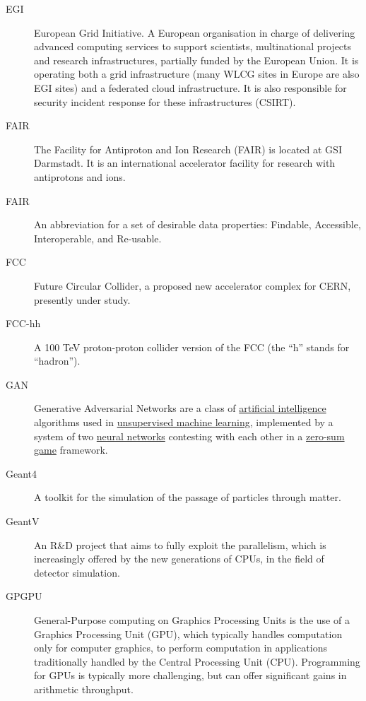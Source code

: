 \documentclass[12pt,a4paper]{article}
\begin{document}
\begin{appendices}
\begin{description}
\item[EGI] European Grid Initiative. A European organisation in charge of
delivering advanced computing services to support scientists,
multinational projects and research infrastructures, partially funded by
the European Union. It is operating both a grid infrastructure (many
WLCG sites in Europe are also EGI sites) and a federated cloud
infrastructure. It is also responsible for security incident response
for these infrastructures (CSIRT).

\item[FAIR] The Facility for Antiproton and Ion Research (FAIR) is located at
GSI Darmstadt. It is an international accelerator facility for research
with antiprotons and ions.

\item[FAIR] An abbreviation for a set of desirable data properties: Findable,
Accessible, Interoperable, and Re-usable.

\item[FCC] Future Circular Collider, a proposed new accelerator complex for
CERN, presently under study.

\item[FCC-hh] A 100 TeV proton-proton collider version of the FCC (the ``h''
stands for ``hadron'').

\item[GAN] Generative Adversarial Networks are a class of
\href{https://en.wikipedia.org/wiki/Artificial_intelligence}{artificial
intelligence} algorithms used in
\href{https://en.wikipedia.org/wiki/Unsupervised_machine_learning}{unsupervised
machine learning}, implemented by a system of two
\href{https://en.wikipedia.org/wiki/Neural_network}{neural networks}
contesting with each other in a
\href{https://en.wikipedia.org/wiki/Zero-sum_game}{zero-sum game}
framework.

\item[Geant4] A toolkit for the simulation of the passage of
particles through matter.

\item[GeantV] An R\&D project that aims to fully exploit the
parallelism, which is increasingly offered by the new generations of CPUs, in the field of detector simulation.

\item[GPGPU] General-Purpose computing on Graphics Processing Units is the use of a Graphics Processing Unit (GPU), which typically handles computation only for computer graphics, to perform computation in applications traditionally handled by the Central Processing Unit (CPU). Programming for GPUs is typically more challenging, but can offer significant gains in arithmetic throughput.


\end{description}
\end{appendices}
\end{document}
